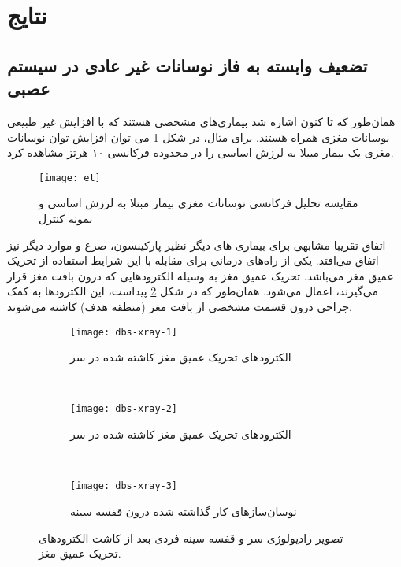 \section{نتایج }
\subsection{تضعیف وابسته به فاز نوسانات غیر عادی در سیستم عصبی}
همان‌طور که تا کنون اشاره شد بیماری‌های مشخصی هستند که با افزایش غیر طبیعی نوسانات مغزی همراه هستند. برای مثال، در شکل
\ref{fig:et-time-freq-analysis}
می توان افزایش توان نوسانات مغزی یک بیمار مبیلا به لرزش اساسی را در محدوده فرکانسی ۱۰ هرتز مشاهده کرد.

\begin{figure}[h]
     \centering
     \texttt{[image: et]}
     \caption{مقایسه تحلیل فرکانسی نوسانات مغزی بیمار مبتلا به لرزش اساسی و نمونه کنترل }
     \label{fig:et-time-freq-analysis}
\end{figure}

اتفاق تقریبا مشابهی برای بیماری های دیگر نظیر پارکینسون، صرع و موارد دیگر نیز اتفاق می‌افتد. یکی از راه‌های درمانی برای مقابله با این شرایط استفاده از تحریک عمیق مغز می‌باشد. تحریک عمیق مغز به وسیله الکترودهایی که درون بافت مغز قرار می‌گیرند، اعمال می‌شود. همان‌طور که در شکل 
\ref{fig:dbs-xray}
پیداست، این الکترودها به کمک جراحی درون قسمت مشخصی از بافت مغز (منطقه هدف) کاشته می‌شوند. 

\begin{figure}
     \centering
     \begin{subfigure}[t]{0.3\textwidth}
         \centering
         \texttt{[image: dbs-xray-1]}
         \caption{الکترودهای تحریک عمیق مغز کاشته شده در سر }
     \end{subfigure}
     \
     \begin{subfigure}[t]{0.3\textwidth}
         \centering
         \texttt{[image: dbs-xray-2]}
         \caption{الکترودهای تحریک عمیق مغز کاشته شده در سر }
     \end{subfigure}
     \
     \begin{subfigure}[t]{0.3\textwidth}
         \centering
         \texttt{[image: dbs-xray-3]}
         \caption{    نوسان‌سازهای کار گذاشته شده درون قفسه سینه}
     \end{subfigure}
        \caption{
تصویر رادیولوژی سر و قفسه سینه فردی بعد از کاشت الکترودهای تحریک عمیق مغز.
         }
        \label{fig:dbs-xray}
\end{figure}

